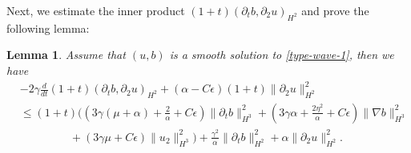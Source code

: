 \documentclass[reqno,11pt]{amsart}
\newtheorem{Lem}[Thm]{Lemma}
\numberwithin{Thm}{section}
\begin{document}
Next, we estimate the inner product $(1+t)(\partial_tb,\partial_2u)_{H^2}$ and prove the following lemma:
 \begin{Lem}\label{key4}
Assume that $(u,b)$ is a smooth
 solution to \eqref{type-wave-1}, then we have
\begin{align}\label{inenergy2}
&-2\gamma\frac{d}{dt}(1+t)(\partial_tb,\partial_2u)_{H^2}+(\alpha-C\epsilon)(1+t)\|\partial_2u\|_{H^2}^2\nonumber\\
&\leq(1+t)\Big((3\gamma(\mu+\alpha)+\frac{2}{\alpha}+C\epsilon)\|\partial_t b\|_{H^3}^2+(3\gamma\alpha+\frac{2\eta^2}{\alpha}+C\epsilon)\|\nabla b\|_{H^3}^2\nonumber\\
&\qquad\quad\quad\ \ +(3\gamma\mu+C\epsilon)\|u_2\|_{H^3}^2\Big)+\frac{\gamma^2}{\alpha}\|\partial_t b\|_{H^2}^2+\alpha\|\partial_2u\|_{H^2}^2.
\end{align}
\end{Lem}
\end{document}

